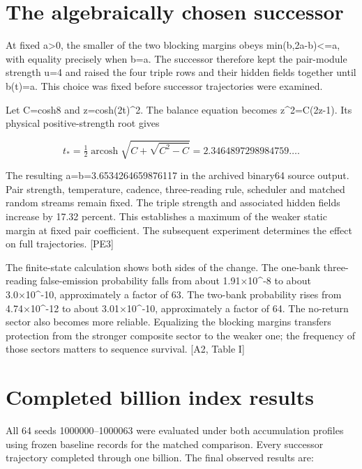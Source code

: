 \section{The algebraically chosen successor}\label{the-algebraically-chosen-successor}

At fixed a\textgreater0, the smaller of the two blocking margins obeys min(b,2a-b)\textless=a, with equality precisely when b=a. The successor therefore kept the pair-module strength u=4 and raised the four triple rows and their hidden fields together until b(t)=a. This choice was fixed before successor trajectories were examined.

Let C=cosh8 and z=cosh(2t)\^{}2. The balance equation becomes z\^{}2=C(2z-1). Its physical positive-strength root gives

\[t_* =\tfrac12\operatorname{arcosh}\sqrt{C+\sqrt{C^2-C}}=2.3464897298984759\ldots.\]

The resulting a=b=3.6534264659876117 in the archived binary64 source output. Pair strength, temperature, cadence, three-reading rule, scheduler and matched random streams remain fixed. The triple strength and associated hidden fields increase by 17.32 percent. This establishes a maximum of the weaker static margin at fixed pair coefficient. The subsequent experiment determines the effect on full trajectories. {[}PE3{]}

The finite-state calculation shows both sides of the change. The one-bank three-reading false-emission probability falls from about 1.91×10\^{}-8 to about 3.0×10\^{}-10, approximately a factor of 63. The two-bank probability rises from 4.74×10\^{}-12 to about 3.01×10\^{}-10, approximately a factor of 64. The no-return sector also becomes more reliable. Equalizing the blocking margins transfers protection from the stronger composite sector to the weaker one; the frequency of those sectors matters to sequence survival. {[}A2, Table I{]}

\section{Completed billion index results}\label{completed-billion-index-results}

All 64 seeds 1000000--1000063 were evaluated under both accumulation profiles using frozen baseline records for the matched comparison. Every successor trajectory completed through one billion. The final observed results are:


